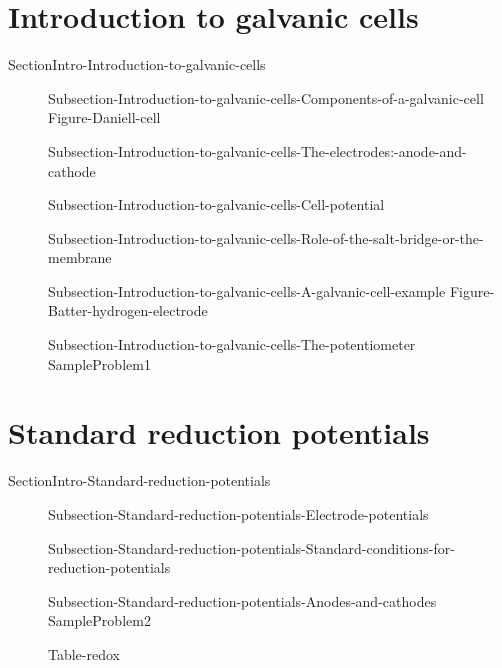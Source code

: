 \documentclass[main.tex]{subfiles}
\begin{document}
\section{Introduction to galvanic cells}{SectionIntro-Introduction-to-galvanic-cells}
\sloppy\begin{description}
\item[] 	{Subsection-Introduction-to-galvanic-cells-Components-of-a-galvanic-cell}
{Figure-Daniell-cell}

\item[]{Subsection-Introduction-to-galvanic-cells-The-electrodes:-anode-and-cathode}
\item[]{Subsection-Introduction-to-galvanic-cells-Cell-potential}
\item[]{Subsection-Introduction-to-galvanic-cells-Role-of-the-salt-bridge-or-the-membrane}
\item[]{Subsection-Introduction-to-galvanic-cells-A-galvanic-cell-example}
{Figure-Batter-hydrogen-electrode}
\item[] {Subsection-Introduction-to-galvanic-cells-The-potentiometer}
 {SampleProblem1}
\end{description}
\newpage
\section{Standard reduction potentials}{SectionIntro-Standard-reduction-potentials} 
\sloppy\begin{description}
\item[]{Subsection-Standard-reduction-potentials-Electrode-potentials}
\item[]{Subsection-Standard-reduction-potentials-Standard-conditions-for-reduction-potentials}
\item[]{Subsection-Standard-reduction-potentials-Anodes-and-cathodes}
{SampleProblem2}

{Table-redox} 
\end{description}
\end{document}
